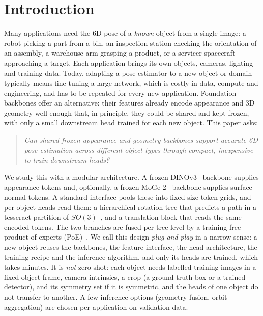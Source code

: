 \section{Introduction}
\label{sec:intro}


Many applications need the 6D pose of a \emph{known} object from a single image: a robot picking a part from a bin, an inspection station checking the orientation of an assembly, a warehouse arm grasping a product, or a servicer spacecraft approaching a target. Each application brings its own objects, cameras, lighting and training data. Today, adapting a pose estimator to a new object or domain typically means fine-tuning a large network, which is costly in data, compute and engineering, and has to be repeated for every new application. Foundation backbones offer an alternative: their features already encode appearance and 3D geometry well enough that, in principle, they could be shared and kept frozen, with only a small downstream head trained for each new object. This paper asks:

\begin{quote}\itshape
Can shared frozen appearance and geometry backbones support accurate 6D pose estimation across different object types through compact, inexpensive-to-train downstream heads?
\end{quote}

We study this with a modular architecture. A frozen DINOv3~\cite{simeoni2025dinov3} backbone supplies appearance tokens and, optionally, a frozen MoGe-2~\cite{wang2025moge2} backbone supplies surface-normal tokens. A standard interface pools these into fixed-size token grids, and per-object heads read them: a hierarchical rotation tree that predicts a path in a tesseract partition of $SO(3)$~\cite{kurz2017tesseract}, and a translation block that reads the same encoded tokens. The two branches are fused per tree level by a training-free product of experts (PoE)~\cite{hinton2002poe}. We call this design \emph{plug-and-play} in a narrow sense: a new object reuses the backbones, the feature interface, the head architecture, the training recipe and the inference algorithm, and only its heads are trained, which takes minutes. It is \emph{not} zero-shot: each object needs labelled training images in a fixed object frame, camera intrinsics, a crop (a ground-truth box or a trained detector), and its symmetry set if it is symmetric, and the heads of one object do not transfer to another. A few inference options (geometry fusion, orbit aggregation) are chosen per application on validation data.

